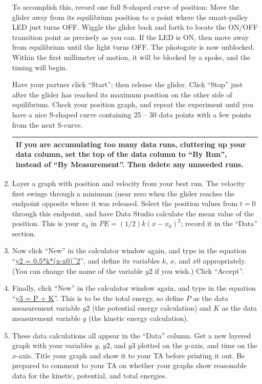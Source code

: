 \begin{enumerate}[label=\arabic*.]
To accomplish this, record one full S-shaped curve of position: Move the glider away from its equilibrium position to a point where the smart-pulley LED just turns OFF.  Wiggle the glider back and forth to locate the ON/OFF transition point as precisely as you can.  If the LED is ON, then move away from equilibrium until the light turns OFF.  The photogate is now unblocked.  Within the first millimeter of motion, it will be blocked by a spoke, and the timing will begin.

Have your partner click ``Start''; then release the glider.  Click ``Stop'' just after the glider has reached its maximum position on the other side of equilibrium.  Check your position graph, and repeat the experiment until you have a nice S-shaped curve containing 25 -- 30 data points with a few points from the next S-curve.

\begin{center}
\begin{tabular}{|p{14cm}|}
\hline\tstrut
If you are accumulating too many data runs, cluttering up your data column, set the top of the data column to ``By Run'', instead of ``By Measurement''.  Then delete any unneeded runs.  \bstrut\\
\hline
\end{tabular}
\end{center}

\item Layer a graph with position and velocity from your best run.  The velocity first swings through a minimum (near zero when the glider reaches the endpoint opposite where it was released.  Select the position values from \(t=0\) through this endpoint, and have Data Studio calculate the mean value of the position.  This is your \(x_0\) in \(PE = (1/2)k(x-x_0)^2\); record it in the ``Data'' section.

\item Now click ``New'' in the calculator window again, and type in the equation ``\url{y2 = 0.5*k*(x-x0)^2}'', and define its variables \(k\), \(x\), and \(x0\) appropriately.  (You can change the name of the variable \(y2\) if you wish.)  Click ``Accept''.

\item Finally, click ``New'' in the calculator window again, and type in the equation ``\url{y3 = P + K}''.  This is to be the total energy, so define \(P\) as the data measurement variable \(y2\) (the potential energy calculation) and \(K\) as the data measurement variable \(y\) (the kinetic energy calculation).

\item These data calculations all appear in the ``Data'' column.  Get a new layered graph with your variables \(y\), \(y2\), and \(y3\) plotted on the \(y\)-axis, and time on the \(x\)-axis.  Title your graph and show it to your TA before printing it out.  Be prepared to comment to your TA on whether your graphs show reasonable data for the kinetic, potential, and total energies.

\end{enumerate}

